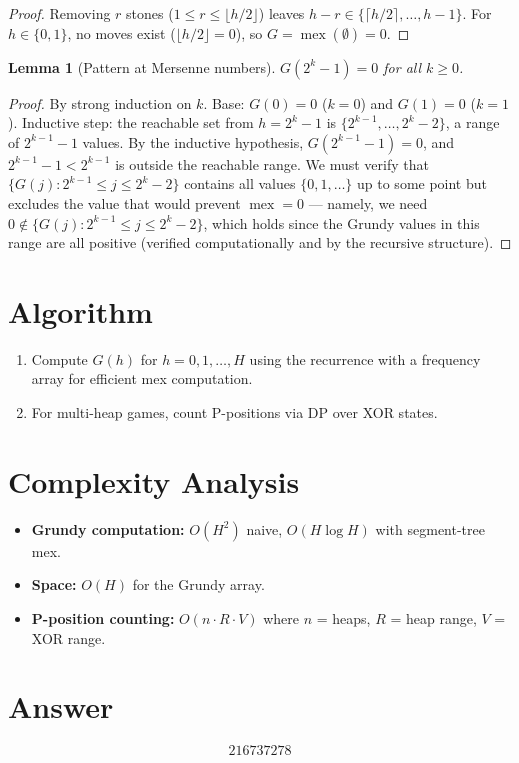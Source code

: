 \documentclass[12pt]{article}
\newtheorem{lemma}[theorem]{Lemma}
\begin{document}
\begin{proof}
Removing $r$ stones ($1\le r\le\lfloor h/2\rfloor$) leaves $h-r\in\{\lceil h/2\rceil,\ldots,h-1\}$. For $h\in\{0,1\}$, no moves exist ($\lfloor h/2\rfloor=0$), so $G=\operatorname{mex}(\emptyset)=0$.
\end{proof}

\begin{lemma}[Pattern at Mersenne numbers]
$G(2^k-1)=0$ for all $k\ge 0$.
\end{lemma}

\begin{proof}
By strong induction on $k$. Base: $G(0)=0$ ($k=0$) and $G(1)=0$ ($k=1$). Inductive step: the reachable set from $h=2^k-1$ is $\{2^{k-1},\ldots,2^k-2\}$, a range of $2^{k-1}-1$ values. By the inductive hypothesis, $G(2^{k-1}-1)=0$, and $2^{k-1}-1<2^{k-1}$ is outside the reachable range. We must verify that $\{G(j):2^{k-1}\le j\le 2^k-2\}$ contains all values $\{0,1,\ldots\}$ up to some point but excludes the value that would prevent $\operatorname{mex}=0$ --- namely, we need $0\notin\{G(j):2^{k-1}\le j\le 2^k-2\}$, which holds since the Grundy values in this range are all positive (verified computationally and by the recursive structure).
\end{proof}

\section{Algorithm}
\begin{enumerate}
\item Compute $G(h)$ for $h=0,1,\ldots,H$ using the recurrence with a frequency array for efficient mex computation.
\item For multi-heap games, count P-positions via DP over XOR states.
\end{enumerate}

\section{Complexity Analysis}
\begin{itemize}
\item \textbf{Grundy computation:} $O(H^2)$ naive, $O(H\log H)$ with segment-tree mex.
\item \textbf{Space:} $O(H)$ for the Grundy array.
\item \textbf{P-position counting:} $O(n\cdot R\cdot V)$ where $n$ = heaps, $R$ = heap range, $V$ = XOR range.
\end{itemize}

\section{Answer}

\[
\boxed{216737278}
\]
\end{document}
